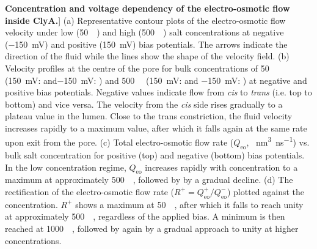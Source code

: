 \begin{figure*}[htbp]
\caption
[\textbf{Concentration and voltage dependency of the electro-osmotic flow inside ClyA.}]
{
(a) Representative contour plots of the electro-osmotic flow velocity under low (\SI{50}{\milli\Molar}) and
high (\SI{500}{\milli\Molar}) salt concentrations at negative (\SI{-150}{\milli\volt}) and positive (\SI{+150}{\milli\volt}) bias potentials.
The arrows indicate the direction of the fluid while the lines show the shape of the velocity field.
(b) Velocity profiles at the centre of the pore for bulk concentrations of \SI{50}{\milli\Molar}
(\SI{+150}{\milli\volt}:  and\SI{-150}{\milli\volt}: ) 
and \SI{500}{\milli\Molar} (\SI{+150}{\milli\volt}:  and 
\SI{-150}{\milli\volt}: ) at negative and positive bias potentials.
Negative values indicate flow from \textit{cis} to \textit{trans} (i.e. top to bottom) and vice versa.
The velocity from the \textit{cis} side rises gradually to a plateau value in the lumen.
Close to the trans constriction, the fluid velocity increases rapidly to a maximum value,
after which it falls again at the same rate upon exit from the pore.
(c) Total electro-osmotic flow rate ($Q_\textrm{eo}$, \SI{}{\cubic\nano\metre\per\nano\second}) vs. bulk salt concentration for positive (top) and negative (bottom) bias potentials.
In the low concentration regime, $Q_\textrm{eo}$ increases rapidly with concentration to a maximum at approximately \SI{500}{\milli\Molar}, followed by by a gradual decline.
(d) The rectification of the electro-osmotic flow rate ($R^+=Q_\textrm{eo}^+/Q_\textrm{eo}^-$) plotted against the concentration.
$R^+$ shows a maximum at \SI{50}{\milli\Molar}, after which it falls to reach unity at approximately \SI{500}{\milli\Molar}, regardless of the applied bias.
A minimum is then reached at \SI{1000}{\milli\Molar}, followed by again by a gradual approach to unity at higher concentrations.
}

\label{fig:electro-osmotic_flow}

\end{figure*}